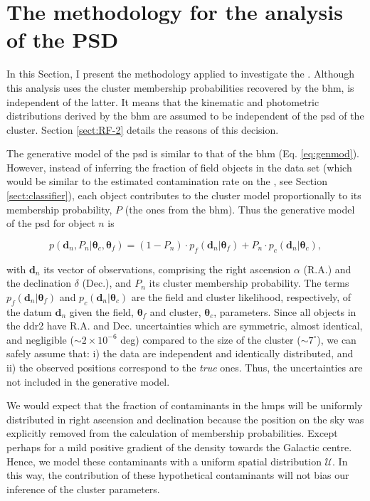\section{The methodology for the analysis of the PSD}
\label{sect:PSDmethod}

In this Section, I present the methodology applied to investigate the . Although this analysis uses the cluster membership probabilities recovered by the \gls{bhm}, is independent of the latter. It means that the kinematic and photometric distributions derived by the  \gls{bhm}  are assumed to be independent of the \gls{psd} of the cluster. Section \ref{sect:RF-2} details the reasons of this decision. 

The generative model of the \gls{psd} is similar to that of the \gls{bhm}  (Eq. \ref{eq:genmod}). However, instead of inferring the fraction of field objects in the data set (which would be similar to the estimated contamination rate on the , see Section \ref{sect:classifier}), each object contributes to the cluster model proportionally to its membership probability, $P$ (the ones from the \gls{bhm}). Thus the generative model of the \gls{psd} for object $n$ is

\begin{equation}
\label{eq:genmodPSD}
p(\mathbf{d}_n, P_n |\boldsymbol{\theta}_c,\boldsymbol{\theta}_f)=(1-P_n) \cdot p_f(\mathbf{d}_n|\boldsymbol{\theta}_f) + P_n\cdot p_c(\mathbf{d}_n| \boldsymbol{\theta}_c),
\end{equation}

with $\mathbf{d}_n$ its vector of observations, comprising the right ascension $\alpha$ (R.A.) and the declination $\delta$ (Dec.), and $P_n$ its cluster membership probability. The terms $p_f(\mathbf{d}_n|\boldsymbol{\theta}_f)$ and $p_c(\mathbf{d}_n|\boldsymbol{\theta}_c)$ are the field and cluster likelihood, respectively, of the datum $\mathbf{d}_n$ given the field, $\boldsymbol{\theta}_f$ and cluster, $\boldsymbol{\theta}_c$, parameters. Since all objects in the \gls{ddr2} have R.A. and Dec. uncertainties which are symmetric, almost identical, and negligible ($\sim 2\times10^{-6}$ deg) compared to the size of the cluster ($\sim7^{\circ}$), we can safely assume that: i) the data are independent and identically distributed, and ii) the observed positions correspond to the \emph{true} ones. Thus, the uncertainties are not included in the generative model. 

We would expect that the fraction of contaminants in the \gls{hmps} will be uniformly distributed in right ascension and declination because the position on the sky was explicitly removed from the calculation of membership probabilities. Except perhaps for a mild positive gradient of the density towards the Galactic centre. Hence, we model these contaminants with a uniform spatial distribution $\mathcal{U}$. In this way, the contribution of these hypothetical contaminants will not bias our inference of the cluster parameters.


